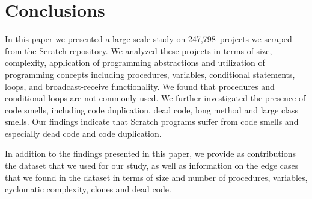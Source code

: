 \documentclass{sig-alternate}
\newcommand{\nAnalyzedPrograms}{247,798}
\begin{document}
\section{Conclusions}
\label{sec:conclusion}
In this paper we presented a large scale study on \nAnalyzedPrograms~projects we scraped from the Scratch repository. We analyzed these projects in terms of size, complexity, application of programming abstractions and utilization of programming concepts including procedures, variables, conditional statements, loops, and broadcast-receive functionality. We found that procedures and conditional loops are not commonly used. We further investigated the presence of code smells, including code duplication, dead code, long method and large class smells. Our findings indicate that Scratch programs suffer from code smells and especially dead code and code duplication.

In addition to the findings presented in this paper, we provide as contributions the dataset that we used for our study, as well as information on the edge cases that we found in the dataset in terms of size and number of procedures, variables, cyclomatic complexity, clones and dead code.\footnotemark[\ref{repo}]



\end{document}
